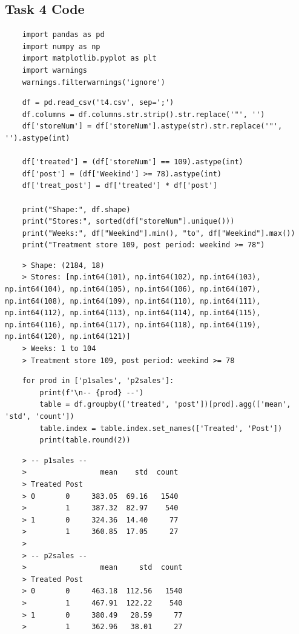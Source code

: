 \documentclass[10pt]{article}
\begin{document}
\subsection{Task 4 Code}
\label{app:task_four}
\begin{lstlisting}
    import pandas as pd 
    import numpy as np
    import matplotlib.pyplot as plt 
    import warnings 
    warnings.filterwarnings('ignore')
\end{lstlisting}
\begin{lstlisting}
    df = pd.read_csv('t4.csv', sep=';')
    df.columns = df.columns.str.strip().str.replace('"', '')
    df['storeNum'] = df['storeNum'].astype(str).str.replace('"', '').astype(int)

    df['treated'] = (df['storeNum'] == 109).astype(int)
    df['post'] = (df['Weekind'] >= 78).astype(int)
    df['treat_post'] = df['treated'] * df['post']

    print("Shape:", df.shape)
    print("Stores:", sorted(df["storeNum"].unique()))
    print("Weeks:", df["Weekind"].min(), "to", df["Weekind"].max())
    print("Treatment store 109, post period: weekind >= 78")
\end{lstlisting}
\begin{verbatim}
    > Shape: (2184, 18)
    > Stores: [np.int64(101), np.int64(102), np.int64(103), np.int64(104), np.int64(105), np.int64(106), np.int64(107), np.int64(108), np.int64(109), np.int64(110), np.int64(111), np.int64(112), np.int64(113), np.int64(114), np.int64(115), np.int64(116), np.int64(117), np.int64(118), np.int64(119), np.int64(120), np.int64(121)]
    > Weeks: 1 to 104
    > Treatment store 109, post period: weekind >= 78
\end{verbatim}
\begin{lstlisting}
    for prod in ['p1sales', 'p2sales']: 
        print(f'\n-- {prod} --')
        table = df.groupby(['treated', 'post'])[prod].agg(['mean', 'std', 'count'])
        table.index = table.index.set_names(['Treated', 'Post'])
        print(table.round(2))
\end{lstlisting}
\begin{verbatim}
    > -- p1sales --
    >                 mean    std  count
    > Treated Post                      
    > 0       0     383.05  69.16   1540
    >         1     387.32  82.97    540
    > 1       0     324.36  14.40     77
    >         1     360.85  17.05     27
    > 
    > -- p2sales --
    >                 mean     std  count
    > Treated Post                       
    > 0       0     463.18  112.56   1540
    >         1     467.91  122.22    540
    > 1       0     380.49   28.59     77
    >         1     362.96   38.01     27
\end{verbatim}
\end{document}

